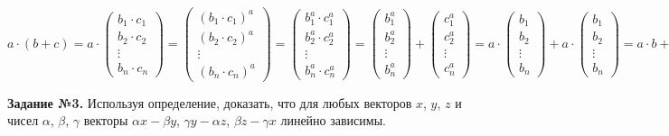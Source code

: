 \documentclass[a4paper, 12pt]{article}
\begin{document}
\[
a \cdot (b + c) = a \cdot
\begin{pmatrix}
    b_1 \cdot c_1 \\ 
    b_2 \cdot c_2 \\  
    \vdots \\
    b_n \cdot c_n
\end{pmatrix} = 
\begin{pmatrix}
    (b_1 \cdot c_1)^a \\ 
    (b_2 \cdot c_2)^a \\  
    \vdots \\
    (b_n \cdot c_n)^a
\end{pmatrix} =
\begin{pmatrix}
    b_1^a \cdot c_1^a \\ 
    b_2^a \cdot c_2^a \\  
    \vdots \\
    b_n^a \cdot c_n^a
\end{pmatrix} = 
\begin{pmatrix}
    b_1^a  \\ 
    b_2^a  \\  
    \vdots \\
    b_n^a 
\end{pmatrix} + 
\begin{pmatrix}
    c_1^a  \\ 
    c_2^a  \\  
    \vdots \\
    c_n^a 
\end{pmatrix} = 
a \cdot 
\begin{pmatrix}
    b_1  \\ 
    b_2  \\  
    \vdots \\
    b_n 
\end{pmatrix} + 
a \cdot 
\begin{pmatrix}
    b_1  \\ 
    b_2  \\  
    \vdots \\
    b_n 
\end{pmatrix}
= a \cdot b + a \cdot c
\] 
\vspace{1cm}

\textbf{Задание №3.} Используя определение, доказать, что для любых векторов $x$, $y$, $z$ и чисел $\alpha$, $\beta$, $\gamma$ векторы $\alpha x - \beta y$, $\gamma y - \alpha z$, $\beta z - \gamma x$ линейно зависимы.

\vspace{0.5cm} 
\end{document}
